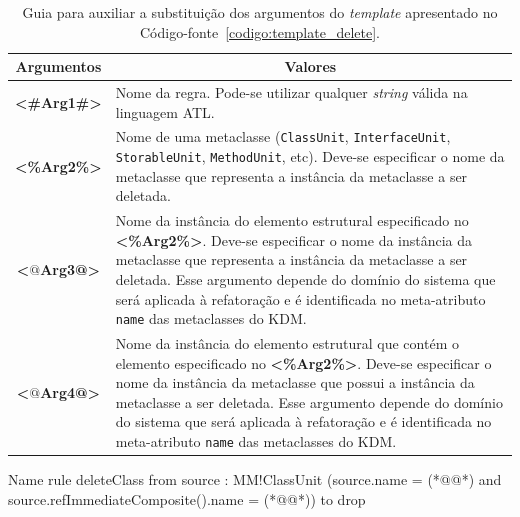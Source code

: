 \begin{table}[h]
\centering
\caption{Guia para auxiliar a substituição dos argumentos do \textit{template} apresentado no Código-fonte~\ref{codigo:template_delete}.}
\label{tab:guia_template_operacao_delete}
\begin{tabular}{ | m{1.7cm} | m{12cm}| } 
\hline
\multicolumn{1}{|c|}{Argumentos}                                         & \multicolumn{1}{c|}{Valores} \\ \hline
\multicolumn{1}{|c|}{\textbf{<\#Arg1\#>}} & Nome da regra. Pode-se utilizar qualquer \textit{string} válida na linguagem ATL. \\  
\hline
\multicolumn{1}{|c|}{\textbf{<\%Arg2\%>}} & Nome de uma metaclasse (\texttt{ClassUnit}, \texttt{InterfaceUnit}, \texttt{StorableUnit}, \texttt{MethodUnit}, etc). Deve-se especificar o nome da metaclasse que representa a instância da metaclasse a ser deletada. \\ 
\hline
\multicolumn{1}{|c|}{\textbf{<$@$Arg3@>}} & Nome da instância do elemento estrutural especificado no \textbf{<\%Arg2\%>}. Deve-se especificar o nome da instância da metaclasse que representa a instância da metaclasse a ser deletada. Esse argumento depende do domínio do sistema que será aplicada à refatoração e é identificada no meta-atributo \texttt{name} das metaclasses do KDM.  \\ 
\hline
\multicolumn{1}{|c|}{\textbf{<$@$Arg4@>}} & Nome da instância do elemento estrutural que contém o elemento especificado no \textbf{<\%Arg2\%>}. Deve-se especificar o nome da instância da metaclasse que possui a instância da metaclasse a ser deletada. Esse argumento depende do domínio do sistema que será aplicada à refatoração e é identificada no meta-atributo \texttt{name} das metaclasses do KDM.  \\ 
\hline
\end{tabular}
\end{table}

\begin{codigo}[caption={[ATL para realizar a operação atômica \texttt{delete} \texttt{ClassUnit}.] ATL para realizar a operação atômica \texttt{delete} \texttt{ClassUnit}.},escapeinside={(*@}{@*)}, basicstyle=\footnotesize, label={codigo:exemplo_delete_classUnit}, language=ATL]{Name}
rule deleteClass {
  from
      source : MM!ClassUnit (source.name = (*@@*) and source.refImmediateComposite().name = (*@@*))
  to
      drop
}
\end{codigo}

